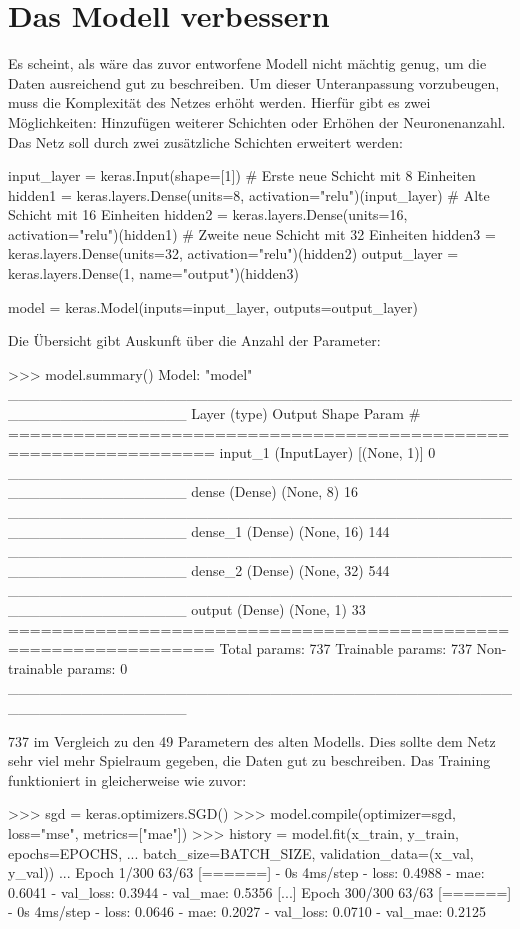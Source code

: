 \section{Das Modell verbessern}
Es scheint, als wäre das zuvor entworfene Modell nicht mächtig genug,
um die Daten ausreichend gut zu beschreiben.
Um dieser Unteranpassung vorzubeugen, muss die Komplexität des Netzes
erhöht werden. Hierfür gibt es zwei Möglichkeiten:
Hinzufügen weiterer Schichten oder Erhöhen der Neuronenanzahl.
Das Netz soll durch zwei zusätzliche Schichten erweitert werden:
\begin{pythoncode}
input_layer = keras.Input(shape=[1])
# Erste neue Schicht mit 8 Einheiten
hidden1 = keras.layers.Dense(units=8, activation="relu")(input_layer)
# Alte Schicht mit 16 Einheiten
hidden2 = keras.layers.Dense(units=16, activation="relu")(hidden1)
# Zweite neue Schicht mit 32 Einheiten
hidden3 = keras.layers.Dense(units=32, activation="relu")(hidden2)
output_layer = keras.layers.Dense(1, name="output")(hidden3)

model = keras.Model(inputs=input_layer, outputs=output_layer)
\end{pythoncode}
Die Übersicht gibt Auskunft über die Anzahl der Parameter:
\begin{pyconcode}
>>> model.summary()
Model: "model"
_________________________________________________________________
Layer (type)                 Output Shape              Param #   
=================================================================
input_1 (InputLayer)         [(None, 1)]               0         
_________________________________________________________________
dense (Dense)                (None, 8)                 16        
_________________________________________________________________
dense_1 (Dense)              (None, 16)                144       
_________________________________________________________________
dense_2 (Dense)              (None, 32)                544       
_________________________________________________________________
output (Dense)               (None, 1)                 33        
=================================================================
Total params: 737
Trainable params: 737
Non-trainable params: 0
_________________________________________________________________
\end{pyconcode}
737 im Vergleich zu den 49 Parametern des alten Modells.
Dies sollte dem Netz sehr viel mehr Spielraum gegeben,
die Daten gut zu beschreiben.
Das Training funktioniert in gleicherweise wie zuvor:
\begin{pyconcode}
>>> sgd = keras.optimizers.SGD()
>>> model.compile(optimizer=sgd, loss="mse", metrics=["mae"])
>>> history = model.fit(x_train, y_train, epochs=EPOCHS,
...                     batch_size=BATCH_SIZE, validation_data=(x_val, y_val))
...
Epoch 1/300
63/63 [======] - 0s 4ms/step - loss: 0.4988     - mae: 0.6041
                             - val_loss: 0.3944 - val_mae: 0.5356
[...]
Epoch 300/300
63/63 [======] - 0s 4ms/step - loss: 0.0646     - mae: 0.2027
                             - val_loss: 0.0710 - val_mae: 0.2125
\end{pyconcode}
